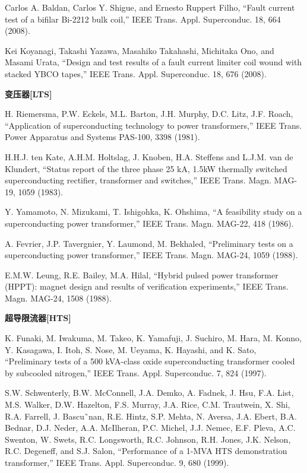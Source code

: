 \noindent [9.150] Carlos A. Baldan, Carlos Y. Shigue, and Ernesto Ruppert Filho, ``Fault current
test of a bifilar Bi-2212 bulk coil,” IEEE Trans. Appl. Superconduc. 18, 664
(2008).

\noindent [9.151] Kei Koyanagi, Takashi Yazawa, Masahiko Takahashi, Michitaka Ono, and Masami
Urata, ``Design and test results of a fault current limiter coil wound with stacked
YBCO tapes,” IEEE Trans. Appl. Superconduc. 18, 676 (2008).

\noindent \textbf{变压器[LTS] }

\noindent [9.152] H. Riemersma, P.W. Eckels, M.L. Barton, J.H. Murphy, D.C. Litz, J.F. Roach,
``Application of superconducting technology to power transformers,” IEEE Trans.
Power Apparatus and Systems PAS-100, 3398 (1981).

\noindent [9.153] H.H.J. ten Kate, A.H.M. Holtslag, J. Knoben, H.A. Steffens and L.J.M. van de
Klundert, ``Status report of the three phase 25 kA, 1.5kW thermally switched
superconducting rectifier, transformer and switches,” IEEE Trans. Magn. MAG-
19, 1059 (1983).

\noindent [9.154] Y. Yamamoto, N. Mizukami, T. Ishigohka, K. Ohshima, ``A feasibility study on a
superconducting power transformer,” IEEE Trans. Magn. MAG-22, 418 (1986).

\noindent [9.155] A. Fevrier, J.P. Tavergnier, Y. Laumond, M. Bekhaled, ``Preliminary tests on a
superconducting power transformer,” IEEE Trans. Magn. MAG-24, 1059 (1988).

\noindent [9.156] E.M.W. Leung, R.E. Bailey, M.A. Hilal, ``Hybrid pulsed power transformer
(HPPT): magnet design and results of verification experiments,” IEEE Trans.
Magn. MAG-24, 1508 (1988).

\noindent \textbf{超导限流器[HTS] }

\noindent [9.157] K. Funaki, M. Iwakuma, M. Takeo, K. Yamafuji, J. Suchiro, M. Hara, M. Konno,
Y. Kasagawa, I. Itoh, S. Nose, M. Ueyama, K. Hayashi, and K. Sato, ``Preliminary
tests of a 500 kVA-class oxide superconducting transformer cooled by subcooled
nitrogen,” IEEE Trans. Appl. Superconduc. 7, 824 (1997).

\noindent [9.158] S.W. Schwenterly, B.W. McConnell, J.A. Demko, A. Fadnek, J. Hsu, F.A. List,
M.S. Walker, D.W. Hazelton, F.S. Murray, J.A. Rice, C.M. Trautwein, X. Shi,
R.A. Farrell, J. Bascu˜nan, R.E. Hintz, S.P. Mehta, N. Aversa, J.A. Ebert, B.A.
Bednar, D.J. Neder, A.A. McIlheran, P.C. Michel, J.J. Nemec, E.F. Pleva, A.C.
Swenton, W. Swets, R.C. Longsworth, R.C. Johnson, R.H. Jones, J.K. Nelson,
R.C. Degeneff, and S.J. Salon, ``Performance of a 1-MVA HTS demonstration
transformer,” IEEE Trans. Appl. Superconduc. 9, 680 (1999).

